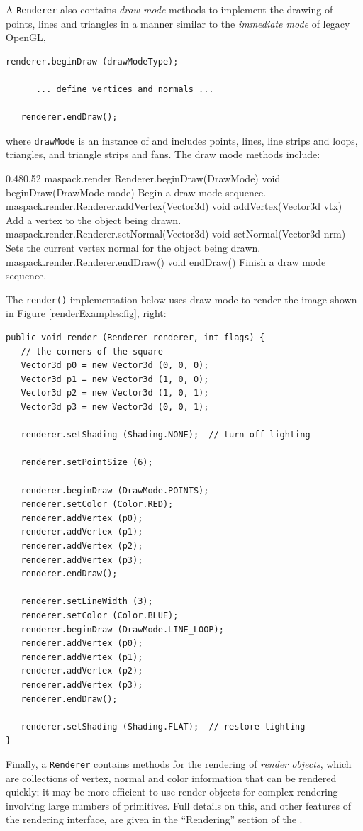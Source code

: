 A {\tt Renderer} also contains {\it draw mode} methods to implement the drawing of points,
lines and triangles in a manner similar to the {\it immediate mode} of legacy OpenGL,
%
\begin{lstlisting}[]
   renderer.beginDraw (drawModeType);

      ... define vertices and normals ...

   renderer.endDraw();
\end{lstlisting}
%
where {\tt drawMode} is an instance
of  and includes points,
lines, line strips and loops, triangles, and triangle strips and
fans. The draw mode methods include:
%
\begin{methodtable}{0.48}{0.52}
\midline
%
\methodentry
{maspack.render.Renderer.beginDraw(DrawMode)}%
{void beginDraw(DrawMode mode)}%
{Begin a draw mode sequence.}%
%
\methodentry
{maspack.render.Renderer.addVertex(Vector3d)}%
{void addVertex(Vector3d vtx)}%
{Add a vertex to the object being drawn.}%
%
\methodentry
{maspack.render.Renderer.setNormal(Vector3d)}%
{void setNormal(Vector3d nrm)}%
{Sets the current vertex normal for the object being drawn.}%
%
\methodentry
{maspack.render.Renderer.endDraw()}%
{void endDraw()}%
{Finish a draw mode sequence.}%
%
\midline
\end{methodtable}
%
The {\tt render()} implementation below uses draw mode to
render the image shown in Figure \ref{renderExamples:fig}, right:
%
\begin{lstlisting}[]
public void render (Renderer renderer, int flags) {
   // the corners of the square
   Vector3d p0 = new Vector3d (0, 0, 0);
   Vector3d p1 = new Vector3d (1, 0, 0);
   Vector3d p2 = new Vector3d (1, 0, 1);
   Vector3d p3 = new Vector3d (0, 0, 1);
   
   renderer.setShading (Shading.NONE);  // turn off lighting

   renderer.setPointSize (6);

   renderer.beginDraw (DrawMode.POINTS);
   renderer.setColor (Color.RED);
   renderer.addVertex (p0);
   renderer.addVertex (p1);
   renderer.addVertex (p2);
   renderer.addVertex (p3);
   renderer.endDraw();

   renderer.setLineWidth (3);
   renderer.setColor (Color.BLUE);
   renderer.beginDraw (DrawMode.LINE_LOOP);
   renderer.addVertex (p0);
   renderer.addVertex (p1);
   renderer.addVertex (p2);
   renderer.addVertex (p3);
   renderer.endDraw();

   renderer.setShading (Shading.FLAT);  // restore lighting
}
\end{lstlisting}
%
Finally, a {\tt Renderer} contains methods for the rendering of {\it
render objects}, which are collections of vertex, normal and color
information that can be rendered quickly; it may be more efficient to
use render objects for complex rendering involving large numbers of
primitives. Full details on this, and other features of the rendering
interface, are given in the ``Rendering'' section of the
.

